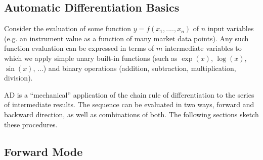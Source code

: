 \documentclass[12pt, a4paper]{report}
\begin{document}
\subsection{Automatic Differentiation Basics}
\label{sec:ad}

Consider the evaluation of some function $y=f(x_1, ...., x_n)$ of $n$
input variables (e.g. an instrument value as a function of many market
data points).  Any such function evaluation can be expressed in terms
of $m$ intermediate variables to which we apply simple unary built-in 
functions (such as $\exp(x)$, $\log(x)$, $\sin(x)$, ...) and binary 
operations (addition, subtraction, multiplication, division).  

AD is a ``mechanical'' application of the chain rule of differentiation
to the series of intermediate results. The sequence can be evaluated
in two ways, forward and backward direction, as well as combinations of
both. The following sections sketch these procedures.

\subsection*{Forward Mode}
\end{document}
